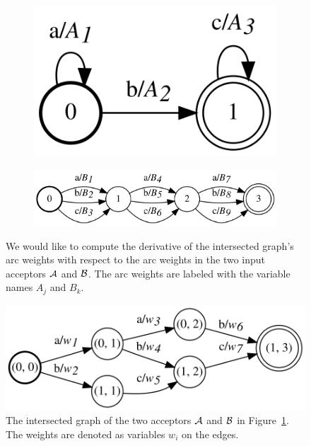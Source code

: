 \begin{figure}
    \centering
    \begin{subfigure}[b]{0.3\textwidth}
        \centering
        \includegraphics[scale=\dotscale]{figures/intersect_grad_1}
    \end{subfigure}
    \begin{subfigure}[b]{0.68\textwidth}
        \centering
        \includegraphics[scale=\dotscale]{figures/intersect_grad_2}
    \end{subfigure}
    \caption{We would like to compute the derivative of the intersected graph's
    arc weights with respect to the arc weights in the two input acceptors
    $\mathcal{A}$ and $\mathcal{B}$. The arc weights are labeled with the variable names $A_j$
    and $B_k$.}
    \label{fig:intersect_grad_inputs}
\end{figure}

\begin{figure}
    \centering
    \includegraphics[scale=\dotscale]{figures/intersect_grad}
    \caption{The intersected graph of the two acceptors $\mathcal{A}$ and $\mathcal{B}$ in
    Figure~\ref{fig:intersect_grad_inputs}.  The weights are denoted as
    variables $w_i$ on the edges.}
    \label{fig:intersect_grad}
\end{figure}


